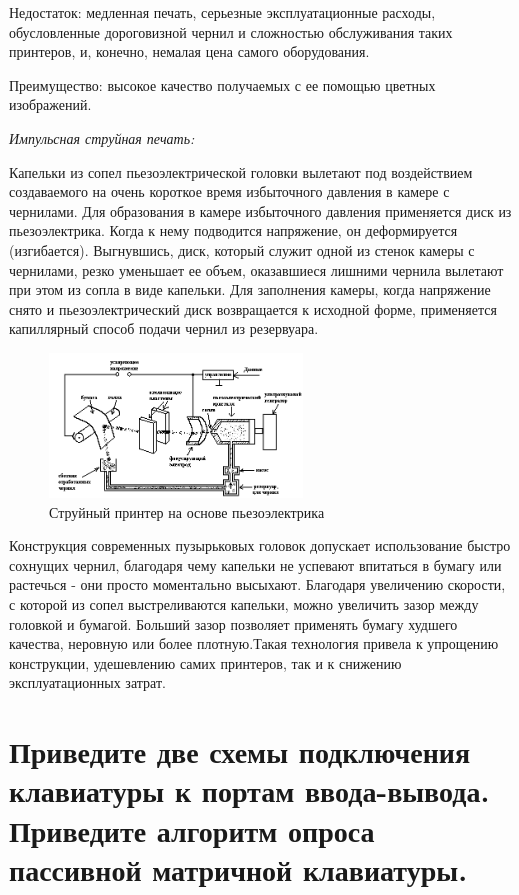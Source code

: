 \documentclass[unicode, 12pt, a4paper, oneside]{article}
\begin{document}
Недостаток: медленная печать, серьезные эксплуатационные расходы, обусловленные дороговизной чернил и сложностью обслуживания таких принтеров, и, конечно, немалая цена самого оборудования.

Преимущество: высокое качество получаемых с ее помощью цветных изображений.

{\sl Импульсная струйная печать:}

Капельки из сопел пьезоэлектрической головки вылетают под воздействием создаваемого на очень короткое время избыточного давления в камере с чернилами. Для образования в камере избыточного давления применяется диск из пьезоэлектрика. Когда к нему подводится напряжение, он деформируется (изгибается). Выгнувшись, диск, который служит одной из стенок камеры с чернилами, резко уменьшает ее объем, оказавшиеся лишними чернила вылетают при этом из сопла в виде капельки. Для заполнения камеры, когда напряжение снято и пьезоэлектрический диск возвращается к исходной форме, применяется капиллярный способ подачи чернил из резервуара. 

\begin{figure}[H]
\centering
\includegraphics[width=0.6\textwidth]{105_Strui.png}
\caption{Струйный принтер на основе пьезоэлектрика }
\end{figure}

Конструкция современных пузырьковых головок допускает использование быстро сохнущих чернил, благодаря чему капельки не успевают впитаться в бумагу или растечься - они просто моментально высыхают. Благодаря увеличению скорости, с которой из сопел выстреливаются капельки, можно увеличить зазор между головкой и бумагой. Больший зазор позволяет применять бумагу худшего качества, неровную или более плотную.Такая технология привела к упрощению конструкции, удешевлению самих принтеров, так и к снижению эксплуатационных затрат.

\section{Приведите две схемы подключения клавиатуры к портам ввода-вывода. Приведите алгоритм опроса пассивной матричной клавиатуры.}
\end{document}
